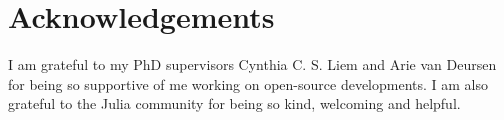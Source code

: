 \documentclass{juliacon}
\begin{document}
\hypertarget{sec-ack}{%
\section{Acknowledgements}\label{sec-ack}}

I am grateful to my PhD supervisors Cynthia C. S. Liem and Arie van
Deursen for being so supportive of me working on open-source
developments. I am also grateful to the Julia community for being so
kind, welcoming and helpful.





\end{document}
